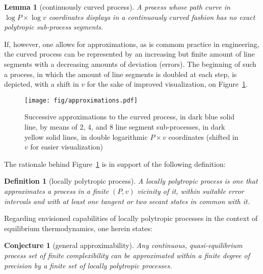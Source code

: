 \documentclass[fleqn,11pt]{SelfArx}
\newtheorem{definition}{Definition}
\newtheorem{lemma}{Lemma}
\newtheorem{conjecture}{Conjecture}
\begin{document}
    \begin{lemma}[continuously curved process]\label{lemm:curved.proc}
        A process whose path curve  in  $\log  P  \times  \log  v$  coordinates  displays  in  a
        continuously curved fashion has no exact polytropic sub-process segments.
    \end{lemma}

    If, however, one allows for approximations, as is commom practice in engineering, the curved
    process can be represented by an increasing but  finite  amount  of  line  segments  with  a
    decreasing amounts of deviation (errors). The beginning of such  a  process,  in  which  the
    amount of line segments is doubled at each step, is depicted, with a shift in  $v$  for  the
    sake of improved visualization, on Figure~\ref{fig:approx}.

    \begin{figure}[ht]
        \centering
        \texttt{[image: fig/approximations.pdf]}
        \caption{Successive approximations to the curved process, in dark blue  solid  line,  by
            means of 2, 4, and 8 line segment sub-processes, in  dark  yellow  solid  lines,  in
            double  logarithmic  $P\times  v$   coordinates   (shifted   in   $v$   for   easier
            visualization)}
        \label{fig:approx}
    \end{figure}

    The rationale behind Figure~\ref{fig:approx} is in support of the following definition:

    \begin{definition}[locally polytropic process]\label{def:locally.polytropic}
        A locally polytropic process is one that approximates a  process  in  a  finite  $(P,v)$
        vicinity of it, within suitable error intervals and with at least  one  tangent  or  two
        secant states in common with it.
    \end{definition}

    Regarding envisioned  capabilities  of  locally  polytropic  processes  in  the  context  of
    equilibrium thermodynamics, one herein states:

    \begin{conjecture}[general approximability]\label{conj:gen.approx}
        Any  continuous,  quasi-equilibrium  process  set  of  finite  complexibility   can   be
        approximated within a finite degree of precision by a finite set of  locally  polytropic
        processes.
    \end{conjecture}
\end{document}
